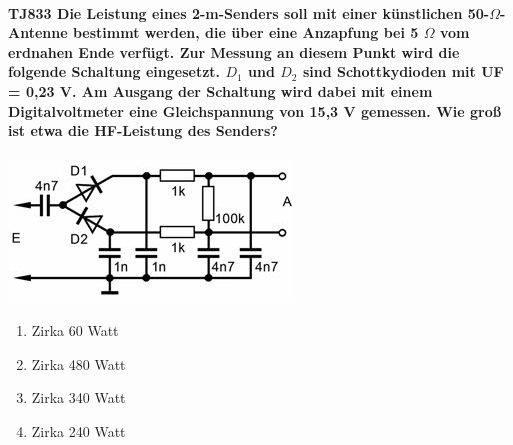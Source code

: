 \documentclass[8pt]{article}
\begin{document}
\paragraph*{TJ833 Die Leistung eines 2-m-Senders soll mit einer künstlichen 50-$\Omega$-Antenne bestimmt werden, die über eine Anzapfung bei 5 $\Omega$ vom erdnahen Ende verfügt. Zur Messung an diesem Punkt wird die folgende Schaltung eingesetzt. $D_{1}$ und $D_{2}$ sind Schottkydioden mit UF = 0,23 V. Am Ausgang der Schaltung wird dabei mit einem Digitalvoltmeter eine Gleichspannung von 15,3 V gemessen. Wie groß ist etwa die HF-Leistung des Senders?} 
\begin{center}
	\begin{minipage}{\linewidth}
		\centering
		\includegraphics[scale=1.0]{pics/tj833_a.jpg}
	\end{minipage}
\end{center}
\begin{enumerate}[nolistsep,label=\Alph*]
\item Zirka 60 Watt
\item Zirka 480 Watt
\item Zirka 340 Watt
\item Zirka 240 Watt
\end{enumerate}
\end{document}
